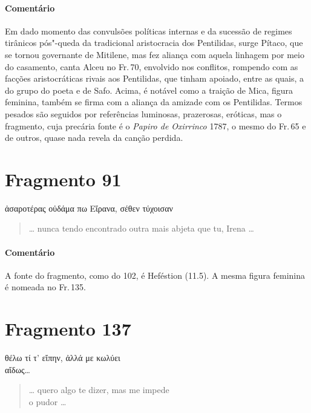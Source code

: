 \medskip

{\paragraph{Comentário} Em dado momento das convulsões políticas internas e da sucessão de regimes
tirânicos pós"-queda da tradicional aristocracia dos Pentilidas, surge Pítaco, que se tornou governante de
Mitilene, mas fez aliança com aquela linhagem por meio do casamento,
canta Alceu no Fr.\,70, envolvido nos conflitos,
rompendo com as facções aristocráticas rivais aos Pentilidas, que tinham apoiado, entre as quais, a
do grupo do poeta e de Safo. Acima, é notável como a traição de 
Mica, figura feminina, também se firma com a aliança da amizade com os Pentilidas. Termos
pesados são seguidos por referências luminosas, prazerosas, eróticas, mas o
fragmento, cuja precária fonte é o \textit{Papiro de Oxirrinco} 1787, o mesmo do Fr.\,65 e de outros, quase nada revela da canção perdida.}


\pagebreak
\section{Fragmento 91}

\begin{gkverse}
ἀσαροτέρας οὐδάμα πω Εἴρανα, σέθεν τύχοισαν
\end{gkverse}

\begin{verse}
\ldots{} nunca tendo encontrado outra mais abjeta que tu, Irena \ldots{}
\end{verse}

\medskip

{\paragraph{Comentário} A fonte do fragmento, como do 102, é Heféstion (11.5).
A mesma figura feminina é nomeada no Fr.\,135.}


\section{Fragmento 137}

\begin{gkverse}
θέλω τί τ’ εἴπην, ἀλλά με κωλύει\\
αἴδως\ldots{}
\end{gkverse}

\begin{verse}
\ldots{} quero algo te dizer, mas me impede\\
o pudor \ldots{}
\end{verse}

